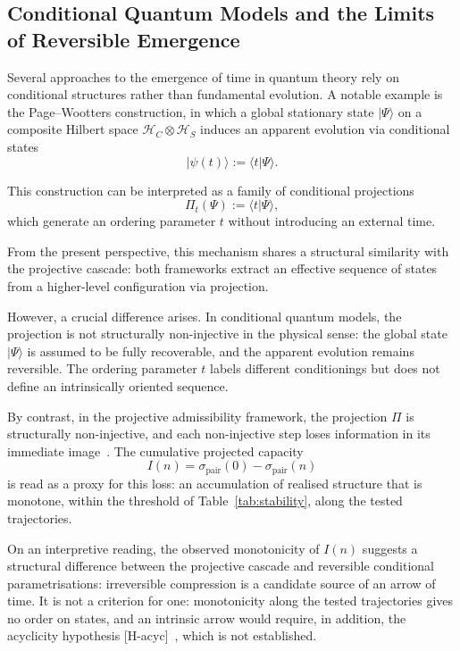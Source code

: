 \documentclass[11pt,a4paper]{article}
\begin{document}
  \subsection{Conditional Quantum Models and the Limits of Reversible Emergence}

  Several approaches to the emergence of time in quantum theory rely on
  conditional structures rather than fundamental evolution.
  A notable example is the Page--Wootters construction, in which a global stationary state
  $|\Psi\rangle$ on a composite Hilbert space $\mathcal{H}_C \otimes \mathcal{H}_S$
  induces an apparent evolution via conditional states
  \[
    |\psi(t)\rangle := \langle t | \Psi \rangle.
  \]

  This construction can be interpreted as a family of conditional projections
  \[
    \Pi_t(\Psi) := \langle t | \Psi \rangle,
  \]
  which generate an ordering parameter $t$ without introducing an external time.

  From the present perspective, this mechanism shares a structural similarity
  with the projective cascade: both frameworks extract an effective sequence
  of states from a higher-level configuration via projection.

  However, a crucial difference arises.
  In conditional quantum models, the projection is not structurally non-injective in the physical sense: the
  global state $|\Psi\rangle$ is assumed to be fully recoverable, and the apparent evolution remains reversible.
  The ordering parameter $t$ labels different conditionings but does not define an intrinsically oriented sequence.

  By contrast, in the projective admissibility framework, the projection $\Pi$
  is structurally non-injective, and each non-injective step loses information
  in its immediate image~\cite{Beau2026m}.
  The cumulative projected capacity
  \[
    I(n) = \sigma_{\mathrm{pair}}(0) - \sigma_{\mathrm{pair}}(n)
  \]
  is read as a proxy for this loss: an accumulation of realised structure that is
  monotone, within the threshold of Table~\ref{tab:stability}, along the tested
  trajectories.

  On an interpretive reading, the observed monotonicity of $I(n)$ suggests a
  structural difference between the projective cascade and reversible
  conditional parametrisations: irreversible compression is a candidate source
  of an arrow of time.
  It is not a criterion for one: monotonicity along the tested trajectories
  gives no order on states, and an intrinsic arrow would require, in addition,
  the acyclicity hypothesis [H-acyc]~\cite{Beau2026m}, which is not established.
\end{document}
